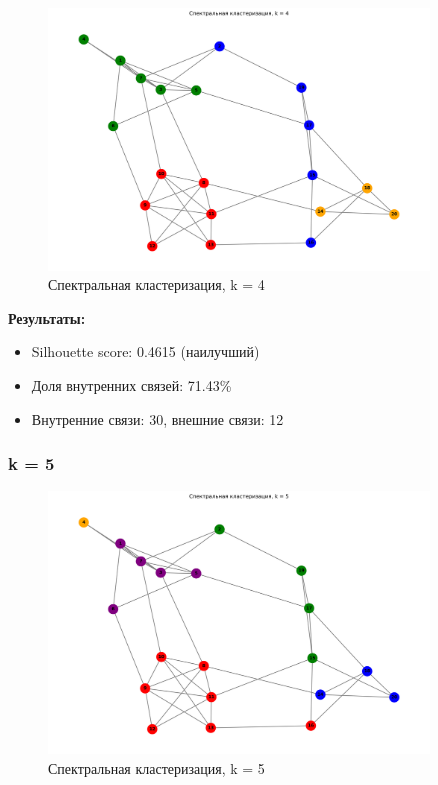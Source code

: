 \begin{figure}[H]
    \centering
    \includegraphics[width=0.9\textwidth]{images/task1/clustering_k4.png}
    \caption{Спектральная кластеризация, k = 4}
\end{figure}

\textbf{Результаты:}
\begin{itemize}
    \item Silhouette score: 0.4615 (наилучший)
    \item Доля внутренних связей: 71.43\%
    \item Внутренние связи: 30, внешние связи: 12
\end{itemize}

\subsubsection*{k = 5}

\begin{figure}[H]
    \centering
    \includegraphics[width=0.9\textwidth]{images/task1/clustering_k5.png}
    \caption{Спектральная кластеризация, k = 5}
\end{figure}

